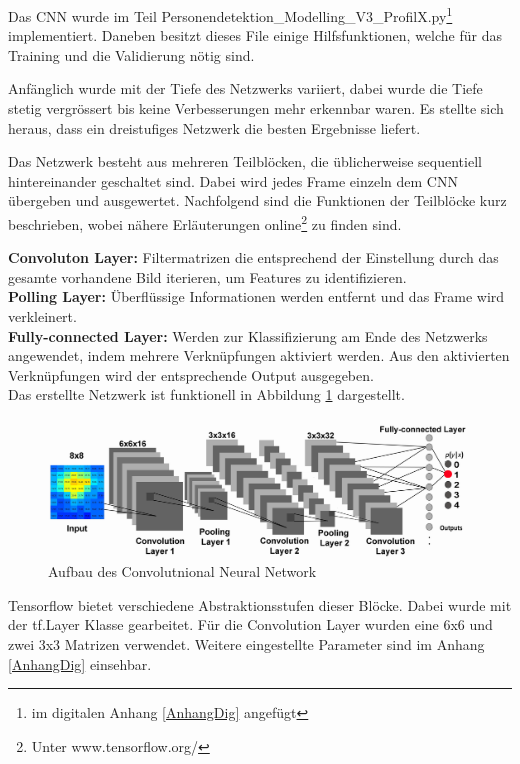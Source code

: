 Das \ac{CNN} wurde im Teil Personendetektion\_Modelling\_V3\_ProfilX.py\footnote{im digitalen Anhang \ref{AnhangDig} angefügt} implementiert. Daneben besitzt dieses File einige Hilfsfunktionen, welche für das Training und die Validierung nötig sind.

Anfänglich wurde mit der Tiefe des Netzwerks variiert, dabei wurde die Tiefe stetig vergrössert bis keine Verbesserungen mehr erkennbar waren. Es stellte sich heraus, dass ein dreistufiges Netzwerk die besten Ergebnisse liefert.

Das Netzwerk besteht aus mehreren Teilblöcken, die üblicherweise sequentiell hintereinander geschaltet sind. Dabei wird jedes Frame einzeln dem CNN übergeben und ausgewertet. Nachfolgend sind die Funktionen der Teilblöcke kurz beschrieben, wobei nähere Erläuterungen online\footnote{Unter www.tensorflow.org/ } zu finden sind.

\textbf{Convoluton Layer:} Filtermatrizen die entsprechend der Einstellung durch das gesamte vorhandene Bild iterieren, um Features zu identifizieren.   \\
\textbf{Polling Layer:} Überflüssige Informationen werden entfernt und das Frame wird verkleinert.   \\
\textbf{Fully-connected Layer:} Werden zur Klassifizierung am Ende des Netzwerks angewendet, indem mehrere Verknüpfungen aktiviert werden. Aus den aktivierten Verknüpfungen wird der entsprechende Output ausgegeben.   \\

Das erstellte Netzwerk ist funktionell in Abbildung \ref{fig:CNN} dargestellt.
\begin{figure}[H]
	\centering
	\includegraphics[width=1\textwidth]
	{fig/CNN_broschuere.jpg}
	\caption[Aufbau des Convolutional Neural Network]{Aufbau des Convolutnional Neural Network}
	\label{fig:CNN}
\end{figure}

Tensorflow bietet verschiedene Abstraktionsstufen dieser Blöcke. Dabei wurde mit der tf.Layer Klasse gearbeitet.
Für die Convolution Layer wurden eine 6x6 und zwei 3x3 Matrizen verwendet.  Weitere eingestellte Parameter sind im  Anhang \ref{AnhangDig} einsehbar.


